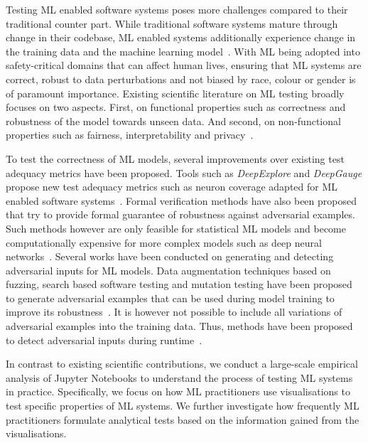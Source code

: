 \documentclass[conference]{IEEEtran}
\begin{document}
Testing ML enabled software systems poses more challenges compared to their traditional counter part. While traditional software systems mature through change in their codebase, ML enabled systems additionally experience change in the training data and the machine learning model~\cite{sculley2015hidden,amershi2019software,sambasivan2021everyone}. With ML being adopted into safety-critical domains that can affect human lives, ensuring that ML systems are correct, robust to data perturbations and not biased by race, colour or gender is of paramount importance. Existing scientific literature on ML testing broadly focuses on two aspects. First, on functional properties such as correctness and robustness of the model towards unseen data. And second, on non-functional properties such as fairness, interpretability and privacy~\cite{zhang2020machine,mehrabi2021survey,chen2022fairness}.

To test the correctness of ML models, several improvements over existing test adequacy metrics have been proposed. Tools such as \textit{DeepExplore} and \textit{DeepGauge} propose new test adequacy metrics such as neuron coverage adapted for ML enabled software systems~\cite{pei2017deepexplore, ma2018deepgauge, gerasimou2020importance}. Formal verification methods have also been proposed that try to provide formal guarantee of robustness against adversarial examples. Such methods however are only feasible for statistical ML models and become computationally expensive for more complex models such as deep neural networks~\cite{zhu2021deepmemory, baluta2021scalable}. Several works have been conducted on generating and detecting adversarial inputs for ML models. Data augmentation techniques based on fuzzing, search based software testing and mutation testing have been proposed to generate adversarial examples that can be used during model training to improve its robustness~\cite{braiek2019deepevolution, gao2020fuzz, wang2021robot, zhang2020white}. It is however not possible to include all variations of adversarial examples into the training data. Thus, methods have been proposed to detect adversarial inputs during runtime~\cite{xiao2021self, wang2020dissector, wang2019adversarial, berend2020cats}.

In contrast to existing scientific contributions, we conduct a large-scale empirical analysis of Jupyter Notebooks to understand the process of testing ML systems in practice. Specifically, we focus on how ML practitioners use visualisations to test specific properties of ML systems. We further investigate how frequently ML practitioners formulate analytical tests based on the information gained from the visualisations.
\end{document}
